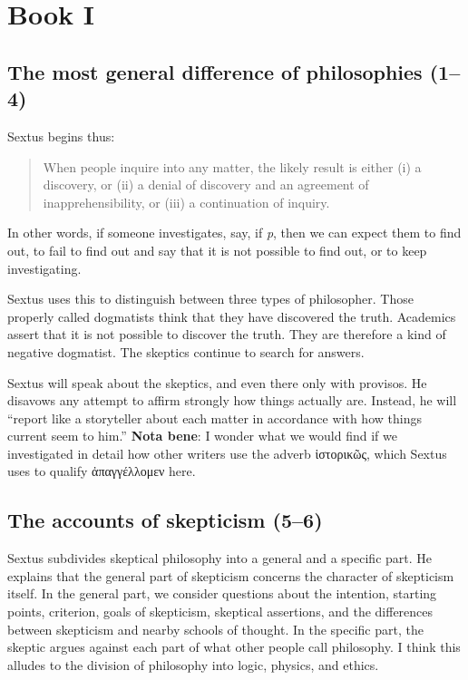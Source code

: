 \chapter{Book I}

\section{The most general difference of philosophies (1--4)}


Sextus begins thus:

\begin{quote}
    When people inquire into any matter, the likely result is either (i) a discovery, or (ii) a denial of discovery and an agreement of inapprehensibility, or (iii) a continuation of inquiry.
\end{quote}

In other words, if someone investigates, say, if \textit{p}, then we can expect them to find out, to fail to find out and say that it is not possible to find out, or to keep investigating.

Sextus uses this to distinguish between three types of philosopher. Those properly called dogmatists think that they have discovered the truth. Academics assert that it is not possible to discover the truth. They are therefore a kind of negative dogmatist. The skeptics continue to search for answers.

Sextus will speak about the skeptics, and even there only with provisos. He disavows any attempt to affirm strongly how things actually are. Instead, he will ``report like a storyteller about each matter in accordance with how things current seem to him.'' \textbf{Nota bene}: I wonder what we would find if we investigated in detail how other writers use the adverb \textgreek{ἱστορικῶς}, which Sextus uses to qualify \textgreek{ἀπαγγέλλομεν} here.

\section{The accounts of skepticism (5--6)}


Sextus subdivides skeptical philosophy into a general and a specific part. He explains that the general part of skepticism concerns the character of skepticism itself. In the general part, we consider questions about the intention, starting points, criterion, goals of skepticism, skeptical assertions, and the differences between skepticism and nearby schools of thought. In the specific part, the skeptic argues against each part of what other people call philosophy. I think this alludes to the division of philosophy into logic, physics, and ethics.

